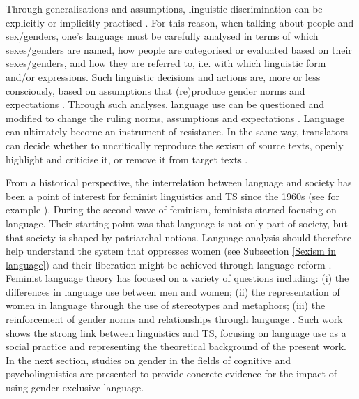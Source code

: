 Through generalisations and assumptions, linguistic discrimination can be explicitly or implicitly practised \citep[7]{sprachhandeln2015tun}. For this reason, when talking about people and sex/genders, one's language must be carefully analysed in terms of which sexes/genders are named, how people are categorised or evaluated based on their sexes/genders, and how they are referred to, i.e. with which linguistic form and/or expressions. Such linguistic decisions and actions are, more or less consciously, based on assumptions that (re)produce gender norms and expectations \citep[11]{sprachhandeln2015tun}. Through such analyses, language use can be questioned and modified to change the ruling norms, assumptions and expectations \citep[12]{sprachhandeln2015tun}. Language can ultimately become an instrument of resistance. In the same way, translators can decide whether to uncritically reproduce the sexism of source texts, openly highlight and criticise it, or remove it from target texts \citep{burton2010inverting}. %

From a historical perspective, the interrelation between language and society has been a point of interest for feminist linguistics and TS since the 1960s (see for example \cite{cameron1985feminism,simon1996gender,kramer2016feminist,von2016translation}). During the second wave of feminism, feminists started focusing on language. Their starting point was that language is not only part of society, but that society is shaped by patriarchal notions. Language analysis should therefore help understand the system that oppresses women (see Subsection \ref{Sexism in language}) and their liberation might be achieved through language reform \citep[3]{cameron1985feminism}. Feminist language theory has focused on a variety of questions including: (i) the differences in language use between men and women; (ii) the representation of women in language through the use of stereotypes and metaphors; (iii) the reinforcement of gender norms and relationships through language \citep[8]{von2016translation}. Such work shows the strong link between linguistics and TS, focusing on language use as a social practice and representing the theoretical background of the present work. In the next section, studies on gender in the fields of cognitive and psycholinguistics are presented to provide concrete evidence for the impact of using gender-exclusive language.

